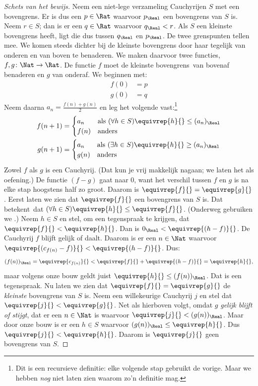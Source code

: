 \documentclass[openany]{memoir}
\begin{document}
\begin{proof}[Schets van het bewijs] Neem een niet-lege verzameling
Cauchyrijen $S$ met een bovengrens. Er is dus een $p \in \Rat$ waarvoor
$p_{\Real}$ een bovengrens van $S$ is. Neem $r \in S$; dan is er een
$q \in \Rat$ waarvoor $q_{\Real} < r$. Als $S$ een kleinste bovengrens
heeft, ligt die dus tussen $q_\Real$ en $p_\Real$. De twee grenspunten
tellen mee.
We komen steeds dichter bij de kleinste bovengrens door haar tegelijk
van onderen en van boven te benaderen. We maken daarvoor twee functies,
$f, g \colon \Nat \to \Rat$. De functie $f$ moet de kleinste
bovengrens\ van bovenaf benaderen en $g$ van onderaf. We beginnen met:
\begin{align*}
	f(0) &= p \\
	g(0) &= q
\end{align*}
Neem daarna $a_n = \frac{f(n) + g(n)}{2}$ en leg het volgende
vast:\footnote{Dit is een recursieve definitie: elke volgende stap
gebruikt de vorige. Maar we hebben \emph{nog} niet laten zien waarom
zo'n definitie mag.}
\begin{align*}
	f(n+1) &=
	\begin{cases}
		a_n &\text{als }(\forall h \in S)\equivrep{h}{} \leq (a_n)_\Real\\
		f(n)&\text{anders}
	\end{cases}\\
	g(n+1) &=
	\begin{cases}
		a_n &\text{als }(\exists h \in S)\equivrep{h}{} \geq (a_n)_\Real\\
	 	g(n) &\text{anders}
	\end{cases}
\end{align*}
Zowel $f$ als $g$ is een Cauchyrij. (Dat kun je vrij makkelijk
nagaan; we laten het als oefening.) De functie $(f-g)$ gaat naar $0$,
want het verschil tussen $f$ en $g$ is na elke stap hoogstens half zo groot.
Daarom is $\equivrep{f}{} = \equivrep{g}{}$.
Eerst laten we zien dat $\equivrep{f}{}$ een bovengrens van $S$ is.
Dat betekent\ dat $(\forall h \in S)\equivrep{h}{} \leq
\equivrep{f}{}$. (Onderweg gebruiken we
.) Neem $h \in S$ en stel, om een
tegenspraak te krijgen, dat $\equivrep{f}{} < \equivrep{h}{}$. Dan is
$0_\Real < \equivrep{(h-f)}{}$. De Cauchyrij $f$ blijft gelijk of
daalt. Daarom is er een $n \in \Nat$ waarvoor
$\equivrep{(c_{f(n)} - f)}{} < \equivrep{(h-f)}{}$. Dus:
\[
	(f(n))_\Real = \equivrep{c_{f(n)}}{} < \equivrep{f}{} + \equivrep{(h-f)}{} = \equivrep{h}{},
\]
maar volgens onze bouw geldt juist $\equivrep{h}{} \leq
(f(n))_\Real$. Dat is een tegenspraak.
Nu laten we zien dat $\equivrep{f}{} = \equivrep{g}{}$ de
\emph{kleinste} bovengrens van $S$ is. Neem een willekeurige Cauchyrij
$j$ en stel dat $\equivrep{j}{} < \equivrep{g}{}$. Net als hierboven
volgt, omdat $g$ \emph{gelijk blijft of stijgt}, dat er een $n \in \Nat$ is
waarvoor $\equivrep{j}{} < (g(n))_\Real$. Maar door onze bouw is er een
$h \in S$ waarvoor $(g(n))_\Real \leq \equivrep{h}{}$. Dus
$\equivrep{j}{} < \equivrep{h}{}$. Daarom is $\equivrep{j}{}$ geen
bovengrens van $S$.
\end{proof}
\endgroup
\OLEndChapterHook
\end{document}
